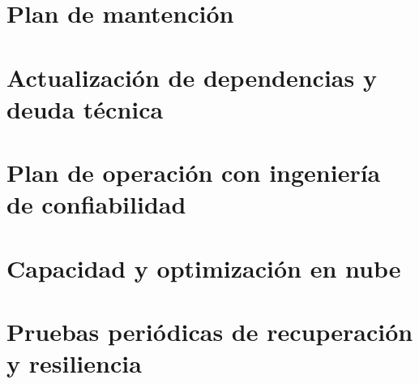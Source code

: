 
\begin{resumenApertura}
\begin{recibe}
  \item {}
\end{recibe}
\end{resumenApertura}

\section{Plan de mantención}\label{sec:11-plan-de-mantencion}


\section{Actualización de dependencias y deuda técnica}\label{sec:11-actualizacion-de-dependencias-y-}


\section{Plan de operación con ingeniería de confiabilidad}\label{sec:11-plan-de-operacion-con-ingenieria}


\section{Capacidad y optimización en nube}\label{sec:11-capacidad-y-optimizacion-en-nube}


\section{Pruebas periódicas de recuperación y resiliencia}\label{sec:11-pruebas-periodicas-de-recuperaci}

